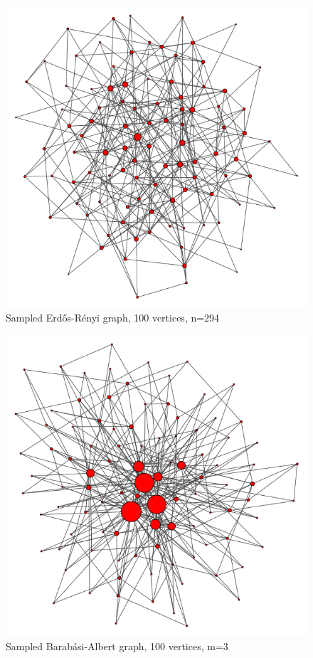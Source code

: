 \documentclass[11pt]{article}
\theoremstyle{definition}
\begin{document}
\begin{appendices}
\begin{figure}[h!]
  \centering
    \includegraphics[width=1\textwidth]{visualisations/Erdos_Renyi_V100_visual.png}
  \caption{Sampled  Erd\H{o}s-R\'enyi graph, 100 vertices, n=294}
  \label{fig:erdosrenyi}
\end{figure}

\begin{figure}[h!]
  \centering
    \includegraphics[width=1\textwidth]{visualisations/Barabasi_Albert_V100_visual.png}
  \caption{Sampled Barab\'asi-Albert graph, 100 vertices, m=3}
  \label{fig:barabasialbert}
\end{figure}

\end{appendices}
\end{document}
